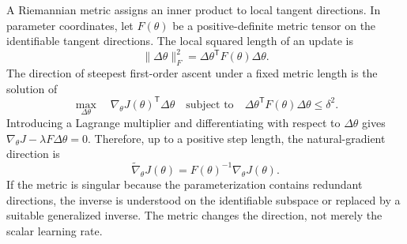 A Riemannian metric assigns an inner product to local tangent directions. In
parameter coordinates, let $F(\theta)$ be a positive-definite metric tensor on
the identifiable tangent directions. The local squared length of an update is
\begin{equation}
    \|\Delta\theta\|_{F}^{2}
    =\Delta\theta^{\mathsf T}F(\theta)\Delta\theta.
    \label{eq:rl-riemannian-length}
\end{equation}
The direction of steepest first-order ascent under a fixed metric length is the
solution of
\begin{equation}
    \max_{\Delta\theta}\quad
    \nabla_\theta J(\theta)^{\mathsf T}\Delta\theta
    \quad\text{subject to}\quad
    \Delta\theta^{\mathsf T}F(\theta)\Delta\theta\leq\delta^2.
    \label{eq:rl-natural-gradient-problem}
\end{equation}
Introducing a Lagrange multiplier and differentiating with respect to
$\Delta\theta$ gives
$\nabla_\theta J-\lambda F\Delta\theta=0$. Therefore, up to a positive step
length, the natural-gradient direction is
\begin{equation}
    \widetilde{\nabla}_\theta J(\theta)
    =F(\theta)^{-1}\nabla_\theta J(\theta).
    \label{eq:rl-natural-gradient}
\end{equation}
If the metric is singular because the parameterization contains redundant
directions, the inverse is understood on the identifiable subspace or replaced
by a suitable generalized inverse. The metric changes the direction, not merely
the scalar learning rate.

